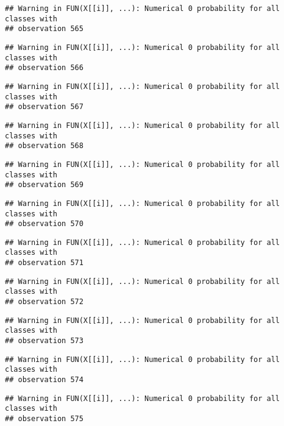 \documentclass[
]{article}
\begin{document}
\begin{verbatim}
## Warning in FUN(X[[i]], ...): Numerical 0 probability for all classes with
## observation 565
\end{verbatim}

\begin{verbatim}
## Warning in FUN(X[[i]], ...): Numerical 0 probability for all classes with
## observation 566
\end{verbatim}

\begin{verbatim}
## Warning in FUN(X[[i]], ...): Numerical 0 probability for all classes with
## observation 567
\end{verbatim}

\begin{verbatim}
## Warning in FUN(X[[i]], ...): Numerical 0 probability for all classes with
## observation 568
\end{verbatim}

\begin{verbatim}
## Warning in FUN(X[[i]], ...): Numerical 0 probability for all classes with
## observation 569
\end{verbatim}

\begin{verbatim}
## Warning in FUN(X[[i]], ...): Numerical 0 probability for all classes with
## observation 570
\end{verbatim}

\begin{verbatim}
## Warning in FUN(X[[i]], ...): Numerical 0 probability for all classes with
## observation 571
\end{verbatim}

\begin{verbatim}
## Warning in FUN(X[[i]], ...): Numerical 0 probability for all classes with
## observation 572
\end{verbatim}

\begin{verbatim}
## Warning in FUN(X[[i]], ...): Numerical 0 probability for all classes with
## observation 573
\end{verbatim}

\begin{verbatim}
## Warning in FUN(X[[i]], ...): Numerical 0 probability for all classes with
## observation 574
\end{verbatim}

\begin{verbatim}
## Warning in FUN(X[[i]], ...): Numerical 0 probability for all classes with
## observation 575
\end{verbatim}
\end{document}
